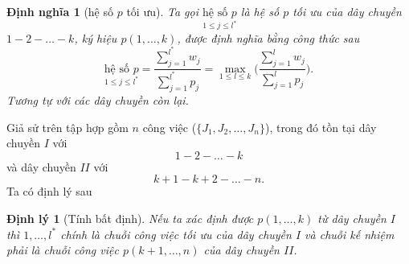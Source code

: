 \documentclass[12pt,a4paper]{report}
\newtheorem{dn}{Định nghĩa}
\newtheorem{dl}{Định lý}
\begin{document}
\begin{dn}[hệ số $p$ tối ưu]
Ta gọi $\underset{1 \leq j \leq l^*}{\text{hệ số }p}$ là hệ số $p$ tối ưu của dây chuyền $1-2-\ldots -k$, ký hiệu $p(1,\ldots,k)$, được định nghĩa bằng công thức sau
\begin{equation}
	\underset{1 \leq j \leq l^*}{\text{hệ số }p}= \frac{\sum_{j=1}^{l^*}w_j}{\sum_{j=1}^{l^*}p_j} = \underset{1 \leq l \leq k}{\max}\Biggl(\frac{\sum_{j=1}^{l}w_j}{\sum_{j=1}^{l}p_j}\Biggl).
\end{equation}
Tương tự với các dây chuyền còn lại.
\end{dn}

Giả sử trên tập hợp gồm $n$ công việc ($\{J_1, J_2, …, J_n\}$), trong đó tồn tại dây chuyền $I$ với
\begin{equation*}
1 - 2 - \ldots - k
\end{equation*}
và dây chuyền $II$ với
\begin{equation*}
k+1 - k+2 - \ldots - n.
\end{equation*}
Ta có định lý sau
\begin{dl}[Tính bất định]
	Nếu ta xác định được $p(1,\ldots,k)$ từ dây chuyền $I$ thì $1,\ldots,l^*$ chính là chuỗi công việc tối ưu của dây chuyền $I$ và chuỗi kế nhiệm phải là chuỗi công việc $p(k+1,\ldots,n)$ của dây chuyền $II$. 
\end{dl}
\end{document}
